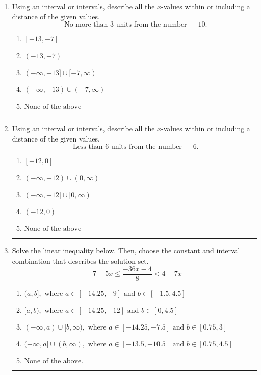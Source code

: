 \documentclass[14pt]{extbook}
\newcommand{\litem}[1]{\item#1\hspace*{-1cm}\rule{\textwidth}{0.4pt}}
\begin{document}
\begin{enumerate}
\litem{
Using an interval or intervals, describe all the $x$-values within or including a distance of the given values.\[ \text{ No more than } 3 \text{ units from the number } -10. \]\begin{enumerate}[label=\Alph*.]
\item \( [-13, -7] \)
\item \( (-13, -7) \)
\item \( (-\infty, -13] \cup [-7, \infty) \)
\item \( (-\infty, -13) \cup (-7, \infty) \)
\item \( \text{None of the above} \)

\end{enumerate} }
\litem{
Using an interval or intervals, describe all the $x$-values within or including a distance of the given values.\[ \text{ Less than } 6 \text{ units from the number } -6. \]\begin{enumerate}[label=\Alph*.]
\item \( [-12, 0] \)
\item \( (-\infty, -12) \cup (0, \infty) \)
\item \( (-\infty, -12] \cup [0, \infty) \)
\item \( (-12, 0) \)
\item \( \text{None of the above} \)

\end{enumerate} }
\litem{
Solve the linear inequality below. Then, choose the constant and interval combination that describes the solution set.\[ -7 - 5 x \leq \frac{-36 x - 4}{8} < 4 - 7 x \]\begin{enumerate}[label=\Alph*.]
\item \( (a, b], \text{ where } a \in [-14.25, -9] \text{ and } b \in [-1.5, 4.5] \)
\item \( [a, b), \text{ where } a \in [-14.25, -12] \text{ and } b \in [0, 4.5] \)
\item \( (-\infty, a) \cup [b, \infty), \text{ where } a \in [-14.25, -7.5] \text{ and } b \in [0.75, 3] \)
\item \( (-\infty, a] \cup (b, \infty), \text{ where } a \in [-13.5, -10.5] \text{ and } b \in [0.75, 4.5] \)
\item \( \text{None of the above.} \)


\end{enumerate}}
\end{enumerate}
\end{document}
